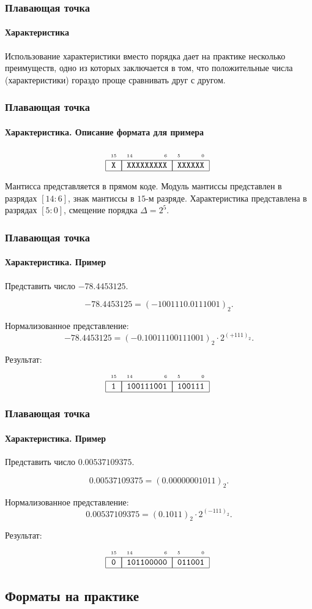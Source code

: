 \begin{frame}
    \frametitle{Плавающая точка}
    \framesubtitle{Характеристика}

    Использование характеристики вместо порядка дает на практике несколько преимуществ, одно из которых заключается в том, что положительные числа (характеристики) гораздо проще сравнивать друг с другом.
\end{frame}
  
\begin{frame}
    \frametitle{Плавающая точка}
    \framesubtitle{Характеристика. Описание формата для примера}
    
    \[
        \FloatMyCharHex{X}{XXXXXXXXX}{XXXXXX}
    \]
    
    Мантисса представляется в прямом коде. Модуль мантиссы представлен в разрядах $[14:6]$, знак мантиссы в $15$-м разряде. Характеристика представлена в разрядах $[5:0]$, смещение порядка $\Delta=2^5$.
\end{frame}

\begin{frame}
    \frametitle{Плавающая точка}
    \framesubtitle{Характеристика. Пример}
    
    Представить число $-78.4453125$.
    
    \[-78.4453125 = (-1001110.0111001)_2.\]
    
    Нормализованное представление:
    \[-78.4453125 = (-0.10011100111001)_2\cdot 2^{(+111)_2}.\]

   Результат:
    \[
        \FloatMyCharHex{1}{100111001}{100111}
    \]
\end{frame}

\begin{frame}
    \frametitle{Плавающая точка}
    \framesubtitle{Характеристика. Пример}
    
    Представить число $0.00537109375$.
    
    \[0.00537109375 = (0.00000001011)_2.\]
    
    Нормализованное представление:
    \[0.00537109375 = (0.1011)_2\cdot 2^{(-111)_2}.\]

   Результат:
    \[
        \FloatMyCharHex{0}{101100000}{011001}
    \]
\end{frame}

  
\subsection{Форматы на практике}

